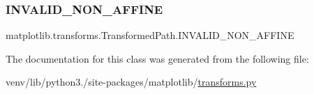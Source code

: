 \subsubsection{\texorpdfstring{I\+N\+V\+A\+L\+I\+D\+\_\+\+N\+O\+N\+\_\+\+A\+F\+F\+I\+NE}{INVALID\_NON\_AFFINE}}
{\footnotesize\ttfamily matplotlib.\+transforms.\+Transformed\+Path.\+I\+N\+V\+A\+L\+I\+D\+\_\+\+N\+O\+N\+\_\+\+A\+F\+F\+I\+NE}



The documentation for this class was generated from the following file\+:\begin{DoxyCompactItemize}
\item 
venv/lib/python3./site-\/packages/matplotlib/\hyperlink{transforms_8py}{transforms.\+py}\end{DoxyCompactItemize}
